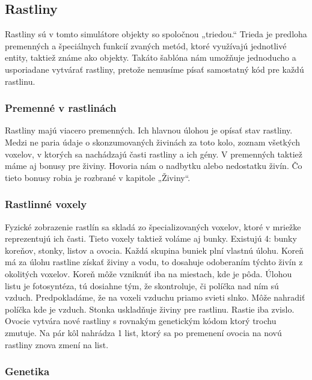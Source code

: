\documentclass[12pt]{article}
\begin{document}
\subsection{Rastliny}

Rastliny sú v tomto simulátore objekty so spoločnou „triedou.“ Trieda je
predloha premenných a špeciálnych funkcií zvaných metód, ktoré využívajú
jednotlivé entity, taktiež známe ako objekty. Takáto šablóna nám umožňuje
jednoducho a usporiadane vytvárať rastliny, pretože nemusíme písať samostatný
kód pre každú rastlinu.

\subsubsection{Premenné v rastlinách}

Rastliny majú viacero premenných. Ich hlavnou úlohou je opísať stav rastliny.
Medzi ne paria údaje o skonzumovaných živinách za toto kolo, zoznam všetkých
voxelov, v ktorých sa nachádzajú časti rastliny a ich gény. V premenných
taktiež máme aj bonusy pre živiny. Hovoria nám o nadbytku alebo nedostatku
živín. Čo tieto bonusy robia je rozbrané v kapitole „Živiny“.

\subsubsection{Rastlinné voxely}

Fyzické zobrazenie rastlín sa skladá zo špecializovaných voxelov, ktoré
v mriežke reprezentujú ich časti. Tieto voxely taktiež voláme aj bunky.
Existujú 4: bunky koreňov, stonky, listov a ovocia. Každá skupina buniek plní
vlastnú úlohu. Koreň má za úlohu rastline získať živiny a vodu, to dosahuje
odoberaním týchto živín z okolitých voxelov. Koreň môže vzniknúť iba na
miestach, kde je pôda. Úlohou listu je fotosyntéza, tú dosiahne tým, že
skontroluje, či políčka nad ním sú vzduch. Predpokladáme, že na voxeli vzduchu
priamo svieti slnko. Môže nahradiť políčka kde je vzduch. Stonka uskladňuje
živiny pre rastlinu.  Rastie iba zvislo. Ovocie vytvára nové rastliny
s rovnakým genetickým kódom ktorý trochu zmutuje. Na pár kôl nahrádza 1 list,
ktorý sa po premenení ovocia na novú rastliny znova zmení na list.

\subsubsection{Genetika}
\end{document}
